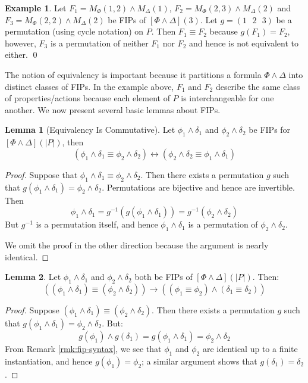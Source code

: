 \documentclass[12pt]{article}
\theoremstyle{definition}
\newtheorem{lemma}{Lemma}
\newtheorem{example}{Example}
\theoremstyle{remark}
\newcommand{\msp}{\text{ }}
\begin{document}
\begin{example}
  Let $F_1 = M_{\Phi}(1,2) \land M_{\Delta}(1)$, $F_2 = M_{\Phi}(2,3) \land M_{\Delta}(2)$ and $F_3 = M_{\Phi}(2,2) \land M_{\Delta}(2)$ be FIPs of $[\Phi\land\Delta](3)$.  Let $g = (1 \msp 2 \msp 3)$ be a permutation (using cycle notation) on $P$.  Then $F_1 \equiv F_2$ because $g(F_1) = F_2$, however, $F_3$ is a permutation of neither $F_1$ nor $F_2$ and hence is not equivalent to either.
  \qed
\end{example}

The notion of equivalency is important because it partitions a formula $\Phi \land \Delta$ into distinct classes of FIPs.  In the example above, $F_1$ and $F_2$ describe the same class of properties/actions because each element of $P$ is interchangeable for one another.  We now present several basic lemmas about FIPs.

\begin{lemma}[Equivalency Is Commutative]
  \label{lem:fip-eq-comm}
  Let $\phi_1\land\delta_1$ and $\phi_2\land\delta_2$ be FIPs for $[\Phi\land\Delta](|P|)$, then
  $$(\phi_1\land\delta_1 \equiv \phi_2\land\delta_2) \leftrightarrow (\phi_2\land\delta_2 \equiv \phi_1\land\delta_1)$$
\end{lemma}
\begin{proof}
  Suppose that $\phi_1\land\delta_1 \equiv \phi_2\land\delta_2$.  Then there exists a permutation $g$ such that $g(\phi_1\land\delta_1) = \phi_2\land\delta_2$.  Permutations are bijective and hence are invertible.  Then
  $$\phi_1\land\delta_1 = g^{-1}(g(\phi_1\land\delta_1)) = g^{-1}(\phi_2\land\delta_2)$$
  But $g^{-1}$ is a permutation itself, and hence $\phi_1\land\delta_1$ is a permutation of $\phi_2\land\delta_2$.

  We omit the proof in the other direction because the argument is nearly identical.
\end{proof}

\begin{lemma}
  \label{lem:and-decomp}
  Let $\phi_1\land\delta_1$ and $\phi_2\land\delta_2$ both be FIPs of $[\Phi\land\Delta](|P|)$.  Then:
  $$((\phi_1\land\delta_1) \equiv (\phi_2\land\delta_2)) \rightarrow ((\phi_1 \equiv \phi_2) \land (\delta_1 \equiv \delta_2))$$
\end{lemma}
\begin{proof}
  Suppose $(\phi_1\land\delta_1) \equiv (\phi_2\land\delta_2)$.  Then there exists a permutation $g$ such that $g(\phi_1\land\delta_1) = \phi_2\land\delta_2$.  But:
  $$g(\phi_1) \land g(\delta_1) = g(\phi_1\land\delta_1) = \phi_2\land\delta_2$$
  From Remark \ref{rmk:fip-syntax}, we see that $\phi_1$ and $\phi_2$ are identical up to a finite instantiation, and hence $g(\phi_1) = \phi_2$; a similar argument shows that $g(\delta_1) = \delta_2$.
\end{proof}
\end{document}
